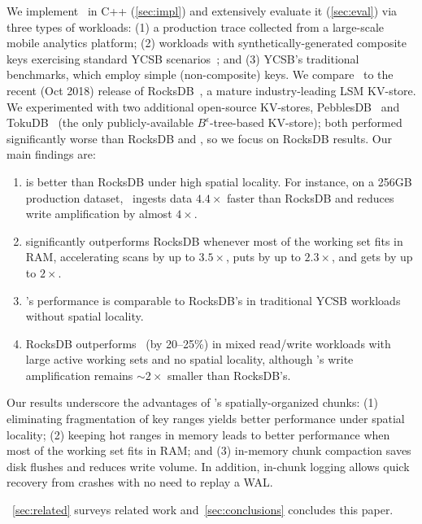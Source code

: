 We implement \sys\ in  C++ (\cref{sec:impl}) and extensively evaluate it (\cref{sec:eval})
via three types of workloads: (1) a production trace collected from a large-scale mobile analytics platform; 
(2)  workloads with synthetically-generated composite keys exercising  standard YCSB scenarios~\cite{YCSB};
and (3)  YCSB's traditional benchmarks, which employ simple (non-composite) keys.  
We compare \sys\ to the recent (Oct 2018) release of RocksDB~\cite{RocksDB}, a mature industry-leading LSM KV-store. 
We  experimented with two additional open-source KV-stores, PebblesDB~\cite{PebblesDB}  and  
TokuDB~\cite{TokuDB} (the only publicly-available $B^{\epsilon}$-tree-based 
KV-store); both performed significantly worse than  RocksDB and \sys, so we focus on RocksDB results. 
Our main findings are: 
\begin{enumerate} 
\item \sys\/ is  better than RocksDB under high spatial  locality.  
For instance, on a 256GB production dataset, \sys\ ingests data $4.4\times$ faster than RocksDB %
and reduces write amplification by almost $4\times$. 
\item \sys\/ significantly outperforms RocksDB whenever most of the working set fits in RAM, 
accelerating scans by up to $3.5\times$, puts by up to $2.3\times$, and gets by up to $2\times$. 
\item \sys's performance is  comparable to RocksDB's in traditional YCSB workloads without spatial locality.
\item RocksDB outperforms \sys\ (by 20--25\%)  in mixed read/write workloads with large active working sets and no spatial locality, 
although \sys's write amplification remains $\sim2\times$ smaller than RocksDB's. 
\end{enumerate}

Our results underscore the advantages of \sys's spatially-organized chunks:
(1) eliminating fragmentation of key ranges  yields better  performance under spatial locality; 
(2) keeping hot ranges in memory leads to better performance when most of the working set fits in RAM; and 
(3) in-memory chunk compaction saves disk flushes and reduces write volume.  
In addition, in-chunk logging allows quick recovery from crashes with no need to replay a WAL.


~\cref{sec:related}  surveys related work and~\cref{sec:conclusions} concludes this paper. 
